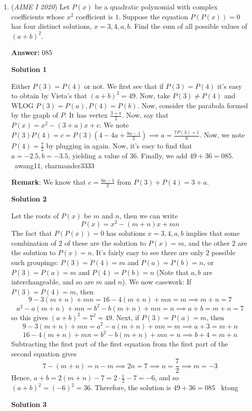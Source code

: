\begin{enumerate}
	\item (\textit{AIME I 2020}) Let $P(x)$ be a quadratic polynomial with complex coefficients whose $x^2$ coefficient is $1.$ Suppose the equation $P(P(x))=0$ has four distinct solutions, $x=3,4,a,b.$ Find the sum of all possible values of $(a+b)^2.$

 \textbf{Answer: }085



\textbf{Solution 1}

Either $P(3) = P(4)$ or not. We first see that if $P(3) = P(4)$ it's easy to obtain by Vieta's that $(a+b)^2 = 49$. Now, take $P(3) \neq P(4)$ and WLOG $P(3) = P(a), P(4) = P(b)$. Now, consider the parabola formed by the graph of $P$. It has vertex $\frac{3+a}{2}$. Now, say that $P(x) = x^2 - (3+a)x + c$. We note $P(3)P(4) = c = P(3)\left(4 - 4a + \frac{8a - 1}{2}\right) \implies a = \frac{7P(3) + 1}{8}$. Now, we note $P(4) = \frac{7}{2}$ by plugging in again. Now, it's easy to find that $a = -2.5, b = -3.5$, yielding a value of $36$. Finally, we add $49 + 36 = \boxed{085}$. ~awang11, charmander3333

 \textbf{Remark}: We know that $c=\frac{8a-1}{2}$ from $P(3)+P(4)=3+a$.

 



\textbf{Solution 2}

Let the roots of $P(x)$ be $m$ and $n$, then we can write 
 \[P(x)=x^2-(m+n)x+mn\] The fact that $P(P(x))=0$ has solutions $x=3,4,a,b$ implies that some combination of $2$ of these are the solution to $P(x)=m$, and the other $2$ are the solution to $P(x)=n$. It's fairly easy to see there are only $2$ possible such groupings: $P(3)=P(4)=m$ and $P(a)=P(b)=n$, or $P(3)=P(a)=m$ and $P(4)=P(b)=n$ (Note that $a,b$ are interchangeable, and so are $m$ and $n$). We now casework: If $P(3)=P(4)=m$, then 
 \[9-3(m+n)+mn=16-4(m+n)+mn=m \implies m+n=7\]
 \[a^2-a(m+n)+mn=b^2-b(m+n)+mn=n \implies a+b=m+n=7\]so this gives $(a+b)^2=7^2=49$. Next, if $P(3)=P(a)=m$, then 
 \[9-3(m+n)+mn=a^2-a(m+n)+mn=m \implies a+3=m+n\]
 \[16-4(m+n)+mn=b^2-b(m+n)+mn=n \implies b+4=m+n\]Subtracting the first part of the first equation from the first part of the second equation gives 
 \[7-(m+n)=n-m \implies 2n=7 \implies n=\frac{7}{2} \implies m=-3\]Hence, $a+b=2(m+n)-7=2\cdot \frac{1}{2}-7=-6$, and so $(a+b)^2=(-6)^2=36$. Therefore, the solution is $49+36=\boxed{085}$ ~ktong

 



\textbf{Solution 3}


\end{enumerate}
